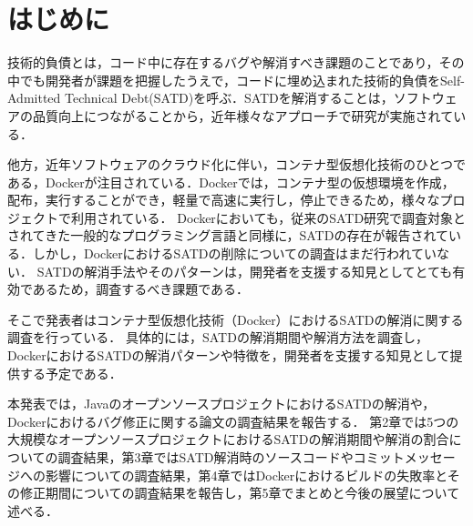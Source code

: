 \section{はじめに}
技術的負債とは，コード中に存在するバグや解消すべき課題のことであり，その中でも開発者が課題を把握したうえで，コードに埋め込まれた技術的負債をSelf-Admitted Technical Debt(SATD)を呼ぶ．SATDを解消することは，ソフトウェアの品質向上につながることから，近年様々なアプローチで研究が実施されている．

\par

他方，近年ソフトウェアのクラウド化に伴い，コンテナ型仮想化技術のひとつである，Dockerが注目されている．Dockerでは，コンテナ型の仮想環境を作成，配布，実行することができ，軽量で高速に実行し，停止できるため，様々なプロジェクトで利用されている．
Dockerにおいても，従来のSATD研究で調査対象とされてきた一般的なプログラミング言語と同様に，SATDの存在が報告されている\cite{docker-satd}．しかし，DockerにおけるSATDの削除についての調査はまだ行われていない．
SATDの解消手法やそのパターンは，開発者を支援する知見としてとても有効であるため，調査するべき課題である．

\par

そこで発表者はコンテナ型仮想化技術（Docker）におけるSATDの解消に関する調査を行っている．
具体的には，SATDの解消期間や解消方法を調査し，DockerにおけるSATDの解消パターンや特徴を，開発者を支援する知見として提供する予定である．

\par

本発表では，JavaのオープンソースプロジェクトにおけるSATDの解消や，Dockerにおけるバグ修正に関する論文の調査結果を報告する．
第2章では5つの大規模なオープンソースプロジェクトにおけるSATDの解消期間や解消の割合についての調査結果，第3章ではSATD解消時のソースコードやコミットメッセージへの影響についての調査結果，第4章ではDockerにおけるビルドの失敗率とその修正期間についての調査結果を報告し，第5章でまとめと今後の展望について述べる．
